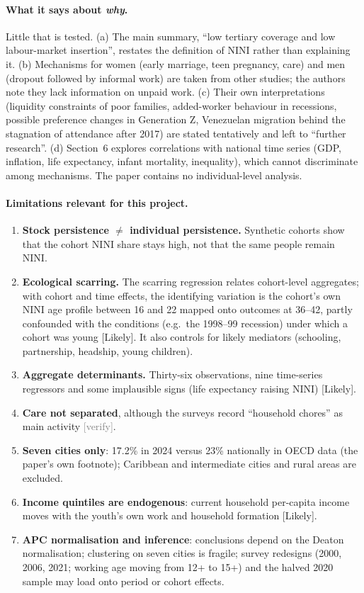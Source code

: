 \documentclass[11pt]{article}
\newcommand{\likely}{\textcolor{orange!80!black}{\textsf{\footnotesize[Likely]}}}
\newcommand{\verify}{\textcolor{gray}{\textsf{\footnotesize[verify]}}}
\begin{document}
\paragraph{What it says about \emph{why}.} Little that is tested. (a) The main summary, ``low tertiary coverage and low labour-market insertion'', restates the definition of NINI rather than explaining it. (b) Mechanisms for women (early marriage, teen pregnancy, care) and men (dropout followed by informal work) are taken from other studies; the authors note they lack information on unpaid work. (c) Their own interpretations (liquidity constraints of poor families, added-worker behaviour in recessions, possible preference changes in Generation Z, Venezuelan migration behind the stagnation of attendance after 2017) are stated tentatively and left to ``further research''. (d) Section~6 explores correlations with national time series (GDP, inflation, life expectancy, infant mortality, inequality), which cannot discriminate among mechanisms. The paper contains no individual-level analysis.

\paragraph{Limitations relevant for this project.}
\begin{enumerate}
\item \textbf{Stock persistence $\neq$ individual persistence.} Synthetic cohorts show that the cohort NINI share stays high, not that the same people remain NINI.
\item \textbf{Ecological scarring.} The scarring regression relates cohort-level aggregates; with cohort and time effects, the identifying variation is the cohort's own NINI age profile between 16 and 22 mapped onto outcomes at 36--42, partly confounded with the conditions (e.g.\ the 1998--99 recession) under which a cohort was young \likely. It also controls for likely mediators (schooling, partnership, headship, young children).
\item \textbf{Aggregate determinants.} Thirty-six observations, nine time-series regressors and some implausible signs (life expectancy raising NINI) \likely.
\item \textbf{Care not separated}, although the surveys record ``household chores'' as main activity \verify.
\item \textbf{Seven cities only}: 17.2\% in 2024 versus 23\% nationally in OECD data (the paper's own footnote); Caribbean and intermediate cities and rural areas are excluded.
\item \textbf{Income quintiles are endogenous}: current household per-capita income moves with the youth's own work and household formation \likely.
\item \textbf{APC normalisation and inference}: conclusions depend on the Deaton normalisation; clustering on seven cities is fragile; survey redesigns (2000, 2006, 2021; working age moving from 12+ to 15+) and the halved 2020 sample may load onto period or cohort effects.
\end{enumerate}
\end{document}
